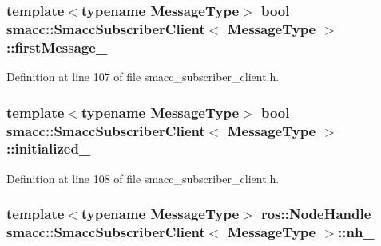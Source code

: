 \subsubsection[{\texorpdfstring{first\+Message\+\_\+}{firstMessage_}}]{\setlength{\rightskip}{0pt plus 5cm}template$<$typename Message\+Type$>$ {\bf bool} {\bf smacc\+::\+Smacc\+Subscriber\+Client}$<$ Message\+Type $>$\+::first\+Message\+\_\+\hspace{0.3cm}{\ttfamily [private]}}\hypertarget{classsmacc_1_1SmaccSubscriberClient_ad7af631a0b6bdacb76a2532a06ad0a03}{}\label{classsmacc_1_1SmaccSubscriberClient_ad7af631a0b6bdacb76a2532a06ad0a03}


Definition at line 107 of file smacc\+\_\+subscriber\+\_\+client.\+h.

\subsubsection[{\texorpdfstring{initialized\+\_\+}{initialized_}}]{\setlength{\rightskip}{0pt plus 5cm}template$<$typename Message\+Type$>$ {\bf bool} {\bf smacc\+::\+Smacc\+Subscriber\+Client}$<$ Message\+Type $>$\+::initialized\+\_\+\hspace{0.3cm}{\ttfamily [private]}}\hypertarget{classsmacc_1_1SmaccSubscriberClient_a429baac945d15cb7d997c41c847f5c33}{}\label{classsmacc_1_1SmaccSubscriberClient_a429baac945d15cb7d997c41c847f5c33}


Definition at line 108 of file smacc\+\_\+subscriber\+\_\+client.\+h.

\subsubsection[{\texorpdfstring{nh\+\_\+}{nh_}}]{\setlength{\rightskip}{0pt plus 5cm}template$<$typename Message\+Type$>$ ros\+::\+Node\+Handle {\bf smacc\+::\+Smacc\+Subscriber\+Client}$<$ Message\+Type $>$\+::nh\+\_\+\hspace{0.3cm}{\ttfamily [protected]}}\hypertarget{classsmacc_1_1SmaccSubscriberClient_addb62aabc4f81ddac5a151642335ab54}{}\label{classsmacc_1_1SmaccSubscriberClient_addb62aabc4f81ddac5a151642335ab54}


